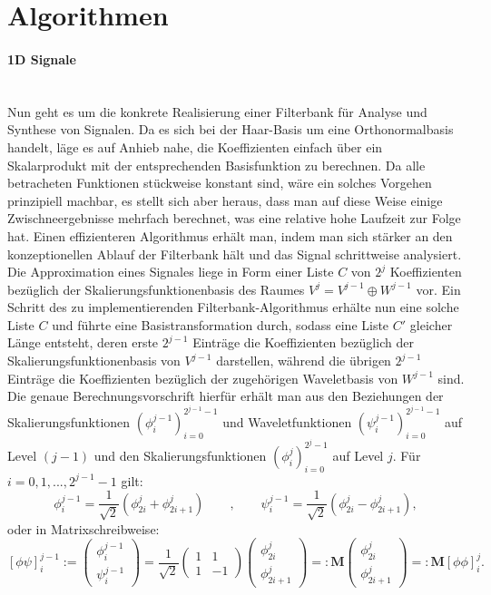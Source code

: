 \section{Algorithmen}
%
\paragraph{1D Signale}~\\
Nun geht es um die konkrete Realisierung einer Filterbank für Analyse und Synthese von Signalen. Da es sich bei der Haar-Basis um eine Orthonormalbasis handelt, läge es auf Anhieb nahe, die Koeffizienten einfach über ein Skalarprodukt mit der entsprechenden Basisfunktion zu berechnen. Da alle betracheten Funktionen stückweise konstant sind, wäre ein solches Vorgehen prinzipiell machbar, es stellt sich aber heraus, dass man auf diese Weise einige Zwischneergebnisse mehrfach berechnet, was eine relative hohe Laufzeit zur Folge hat. Einen effizienteren Algorithmus erhält man, indem man sich stärker an den konzeptionellen Ablauf der Filterbank hält und das Signal schrittweise analysiert.\\
%
Die Approximation eines Signales liege in Form einer Liste $C$ von $2^j$ Koeffizienten bezüglich der Skalierungsfunktionenbasis des Raumes $V^j = V^{j-1} \oplus W^{j-1}$ vor. Ein Schritt des zu implementierenden Filterbank-Algorithmus erhälte nun eine solche Liste $C$ und führte eine Basistransformation durch, sodass eine Liste $C'$ gleicher Länge entsteht, deren erste $2^{j-1}$ Einträge die Koeffizienten bezüglich der Skalierungsfunktionenbasis von $V^{j-1}$ darstellen, während die übrigen $2^{j-1}$ Einträge die Koeffizienten bezüglich der zugehörigen Waveletbasis von $W^{j-1}$ sind.\\
Die genaue Berechnungsvorschrift hierfür erhält man aus den Beziehungen der Skalierungsfunktionen $(\phi_{i}^{j-1})_{i=0}^{2^{j-1}-1}$ und Waveletfunktionen $(\psi_{i}^{j-1})_{i=0}^{2^{j-1}-1}$ auf Level $(j-1)$ und den Skalierungsfunktionen $(\phi_{i}^{j})_{i=0}^{2^{j}-1}$ auf Level $j$. Für $i = 0, 1, ..., 2^{j-1}-1$ gilt:
%
\[
\phi_{i}^{j-1} = \frac{1}{\sqrt{2}}( \phi_{2i}^{j} + \phi_{2i+1}^{j} )
\qquad , \qquad
\psi_{i}^{j-1} = \frac{1}{\sqrt{2}}( \phi_{2i}^{j} - \phi_{2i+1}^{j} )
,
\]
oder in Matrixschreibweise:
\[
\left[ \phi\psi \right]_{i}^{j-1}
:=
\begin{pmatrix}
\phi_{i}^{j-1} \\
\psi_{i}^{j-1}
\end{pmatrix}
=
\frac{1}{\sqrt{2}}
\begin{pmatrix}
1 & 1 \\
1 & -1
\end{pmatrix}
\begin{pmatrix}
\phi_{2i}^{j} \\
\phi_{2i+1}^{j}
\end{pmatrix}
=:
\mathbf{M}
\begin{pmatrix}
\phi_{2i}^{j} \\
\phi_{2i+1}^{j}
\end{pmatrix}
=:
\mathbf{M}
\left[ \phi\phi \right]_{i}^j
.
\]
